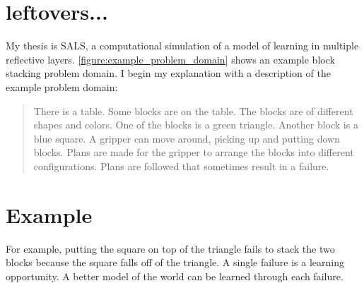 \section{leftovers...}

My thesis is SALS, a computational simulation of a model of learning
in multiple reflective layers.
{\mbox{\autoref{figure:example_problem_domain}}} shows an example block
stacking problem domain.  I begin my explanation with a description of
the example problem domain:
\begin{quote}
There is a table.  Some blocks are on the table.  The blocks are of
different shapes and colors.  One of the blocks is a green triangle.
Another block is a blue square.  A gripper can move around, picking up
and putting down blocks.  Plans are made for the gripper to arrange
the blocks into different configurations.  Plans are followed that
sometimes result in a failure.
\end{quote}


\section{Example}

For example, putting the square on top of the triangle fails to stack
the two blocks because the square falls off of the triangle.  A single
failure is a learning opportunity.  A better model of the world can be
learned through each failure.

